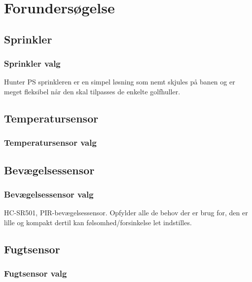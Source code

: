 \chapter{Forundersøgelse}

\section{Sprinkler}								%

\subsection{Sprinkler valg}						%
Hunter PS sprinkleren er en simpel løsning som nemt skjules på banen og er meget fleksibel når den skal tilpasses de enkelte golfhuller.
\clearpage
\section{Temperatursensor}						

\subsection{Temperatursensor valg}				%

\section{Bevægelsessensor}						

\subsection{Bevægelsessensor valg}				%
HC-SR501, PIR-bevægelsessensor. Opfylder alle de behov der er brug for, den er lille og kompakt dertil kan følsomhed/forsinkelse let indstilles.

\clearpage
\section{Fugtsensor}						

\subsection{Fugtsensor valg}						%
